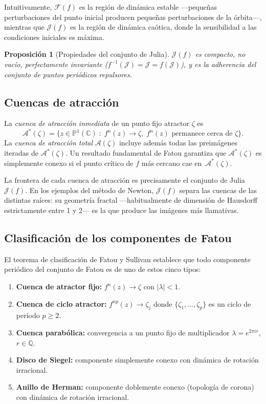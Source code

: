 \documentclass[11pt,a4paper]{article}
\theoremstyle{plain}
\newtheorem{proposicion}[teorema]{Proposición}
\theoremstyle{definition}
\theoremstyle{remark}
\newcommand{\Puno}{\mathbb{P}^1(\mathbb{C})}
\begin{document}
Intuitivamente, $\mathcal{F}(f)$ es la región de dinámica estable
—pequeñas perturbaciones del punto inicial producen pequeñas
perturbaciones de la órbita—, mientras que $\mathcal{J}(f)$ es la
región de dinámica caótica, donde la sensibilidad a las condiciones
iniciales es máxima.

\begin{proposicion}[Propiedades del conjunto de Julia]
$\mathcal{J}(f)$ es compacto, no vacío, perfectamente invariante
($f^{-1}(\mathcal{J})=\mathcal{J}=f(\mathcal{J})$), y es la
adherencia del conjunto de puntos periódicos repulsores.
\end{proposicion}

\subsection{Cuencas de atracción}

La \emph{cuenca de atracción inmediata} de un punto fijo atractor
$\zeta$ es
\[
  \mathcal{A}^*(\zeta)=\{z\in\Puno\;:\;f^n(z)\to\zeta,\;
  f^n(z)\text{ permanece cerca de }\zeta\}.
\]
La \emph{cuenca de atracción total} $\mathcal{A}(\zeta)$ incluye
además todas las preimágenes iteradas de $\mathcal{A}^*(\zeta)$.
Un resultado fundamental de Fatou garantiza que $\mathcal{A}^*(\zeta)$
es simplemente conexo si el punto crítico de $f$ más cercano cae en~$\mathcal{A}^*(\zeta)$.

La frontera de cada cuenca de atracción es precisamente el conjunto
de Julia $\mathcal{J}(f)$.
En los ejemplos del método de Newton, $\mathcal{J}(f)$ separa las
cuencas de las distintas raíces: su geometría fractal —habitualmente
de dimensión de Hausdorff estrictamente entre 1 y 2— es la que produce
las imágenes más llamativas.

\subsection{Clasificación de los componentes de Fatou}

El teorema de clasificación de Fatou y Sullivan establece que todo
componente periódico del conjunto de Fatou es de uno de estos cinco
tipos:

\begin{enumerate}
  \item \textbf{Cuenca de atractor fijo:} $f^n(z)\to\zeta$ con $|\lambda|<1$.
  \item \textbf{Cuenca de ciclo atractor:} $f^{np}(z)\to\zeta_j$ donde
        $\{\zeta_1,\ldots,\zeta_p\}$ es un ciclo de período $p\geq 2$.
  \item \textbf{Cuenca parabólica:} convergencia a un punto fijo de
        multiplicador $\lambda=e^{2\pi i r}$, $r\in\mathbb{Q}$.
  \item \textbf{Disco de Siegel:} componente simplemente conexo con
        dinámica de rotación irracional.
  \item \textbf{Anillo de Herman:} componente doblemente conexo (topología de corona)
        con dinámica de rotación irracional.
\end{enumerate}
\end{document}
